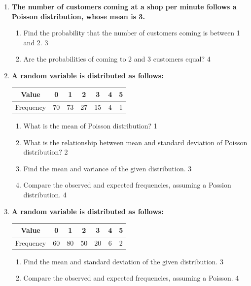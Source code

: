 \documentclass[a4paper,oneside]{book}
\begin{document}
\begin{enumerate}
  
  \item
	  \textbf{The number of customers coming at a shop per minute follows a 
	  Poisson distribution,  whose mean is 3.} 
  
  \begin{enumerate}

    \item  
	Find the probability that the number of customers coming is between 1 and 2. \hfill 3
    \item
	Are the probabilities of coming to 2 and 3 customers equal?  \hfill 4
  \end{enumerate}

 \item
	  \textbf{A random variable is distributed as follows:} 
	  
	  \begin{table}[h]
	  \centering
\begin{tabular}{c|c|c|c|c|c|c}
Value & 0 & 1 & 2 & 3 & 4 & 5 \\ \hline
Frequency & 70 & 73 & 27 & 15 & 4 & 1
\end{tabular}
\end{table}
  
  \begin{enumerate}
    \item
	What is the mean of Poisson distribution? \hfill 1
    \item
	What is the relationship between mean and standard deviation of Poisson 
	distribution? \hfill 2
    \item  
	Find the mean and variance of the given distribution. \hfill 3
    \item
	Compare the observed and expected frequencies, assuming a Possion 
	distribution. \hfill 4
  \end{enumerate}
  
  \item  
\textbf{A random variable is distributed as follows:}  

\begin{table}[h]
\centering
\begin{tabular}{c|c|c|c|c|c|c}
Value & 0 & 1 & 2 & 3 & 4 & 5 \\ \hline
Frequency & 60 & 80 & 50 & 20 & 6 & 2
\end{tabular}
\end{table}

\begin{enumerate}
    \item  
    Find the mean and standard deviation of the given distribution. \hfill 3
    \item  
    Compare the observed and expected frequencies, assuming a Poisson. \hfill 4
\end{enumerate}


  \end{enumerate}
\end{document}
